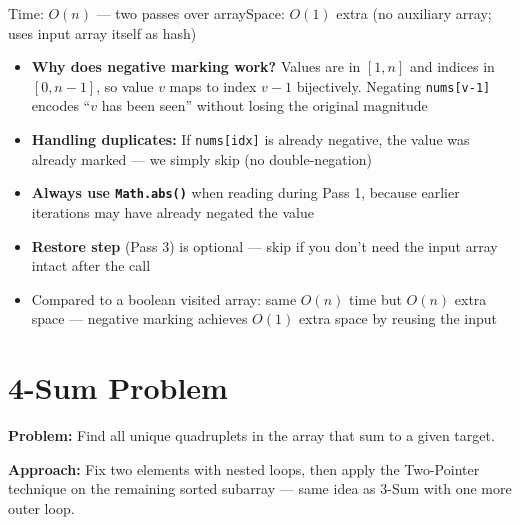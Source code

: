 \documentclass[12pt,a4paper,oneside]{book}
\begin{document}
\begin{complexity}
Time: $O(n)$ --- two passes over array\quad Space: $O(1)$ extra (no auxiliary array; uses input array itself as hash)
\end{complexity}

\begin{interviewcorner}
\begin{itemize}
  \item \textbf{Why does negative marking work?} Values are in $[1,n]$ and indices in $[0,n-1]$, so value $v$ maps to index $v-1$ bijectively. Negating \texttt{nums[v-1]} encodes ``$v$ has been seen'' without losing the original magnitude
  \item \textbf{Handling duplicates:} If \texttt{nums[idx]} is already negative, the value was already marked --- we simply skip (no double-negation)
  \item \textbf{Always use \texttt{Math.abs()}} when reading during Pass 1, because earlier iterations may have already negated the value
  \item \textbf{Restore step} (Pass 3) is optional --- skip if you don't need the input array intact after the call
  \item Compared to a boolean visited array: same $O(n)$ time but $O(n)$ extra space --- negative marking achieves $O(1)$ extra space by reusing the input
\end{itemize}
\end{interviewcorner}

\section{4-Sum Problem}

\textbf{Problem:} Find all unique quadruplets in the array that sum to a given target.

\textbf{Approach:} Fix two elements with nested loops, then apply the Two-Pointer technique on the remaining sorted subarray --- same idea as 3-Sum with one more outer loop.
\end{document}
